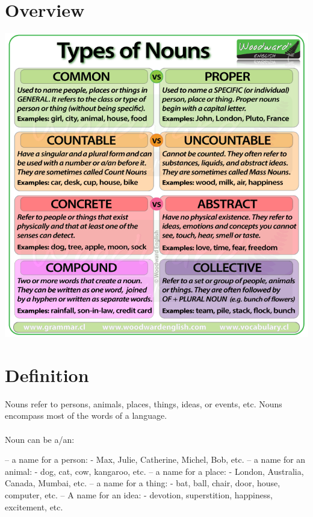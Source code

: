 
\chapter{Overview}
\begin{center}
    \includegraphics[scale=0.5]{project-folders/Noun/overview.png}
\end{center}

\chapter{Definition}
Nouns refer to persons, animals, places, things, ideas, or events, etc.
Nouns encompass most of the words of a language.\\\\
Noun can be a/an:
\begin{itemize}
     – a name for a person: - Max, Julie, Catherine, Michel, Bob, etc.
     – a name for an animal: - dog, cat, cow, kangaroo, etc.
     – a name for a place: - London, Australia, Canada, Mumbai, etc.
     – a name for a thing: - bat, ball, chair, door, house, computer, etc.
     – A name for an idea: - devotion, superstition, happiness, excitement, etc.
\end{itemize}

